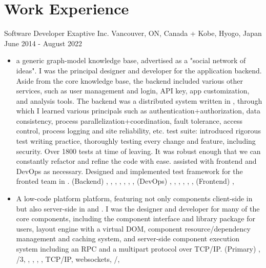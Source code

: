 \section{Work Experience}

\cventry
  {Software Developer} %
  {Exaptive Inc.} %
  {Vancouver, ON, Canada + Kobe, Hyogo, Japan} %
  {June 2014 - August 2022} %
  {
    \begin{itemize} %
      \liststyle
      \item { a generic graph-model knowledge base, advertised as a "social network of ideas".
        I was the principal designer and developer for the application backend.
        Aside from the core knowledge base, the backend included various other services, 
        such as user management and login, API key, app customization, and analysis tools.
        The backend was a distributed system written in \rfnodejs, through which I learned various principals such as 
        authentication+authorization, 
        data consistency, 
        process parallelization+coordination, 
        fault tolerance, 
        access control, 
        process logging and site reliability, 
        etc.
        \tgsubitem test suite: introduced rigorous test writing practice, thoroughly testing every change and feature, including security. 
        Over 1800 tests at time of leaving.
        It was robust enough that we can constantly refactor and refine the code with ease. 
        \tgsubitem assisted with frontend and DevOps as necessary. 
        Designed and implemented test framework for the fronted team in \rfcypress.
        \tgskills (Backend) \rfnodejs, \rfmongodb, \rfneofj, \rfredis, \rfelastic, \rfbash, \rfdocker, 
        (DevOps) \rfaws, \rfansible, \rfterraform, \rfjenkins, \rfnewrelic, \rfsumologic,
        (Frontend) \rfreact, \rfcypress
      }

      \item {
         A low-code platform platform, featuring not only components client-side in \rfjavascript but also server-side in  and \rfrlang.
        I was the designer and developer for many of the core components, including 
        the component interface and library package for users, 
        layout engine with a virtual DOM,
        component resource/dependency management and caching system,
        and 
        server-side component execution system including an RPC and a multipart protocol over TCP/IP.
        \tgskills (Primary) \rfjavascript, /3, \rfclang, \rfmysql, \rfredis, \rfdocker, TCP/IP, websockets, \rfhtml/\rfcss, \rfaws
      }
    \end{itemize}
  }

